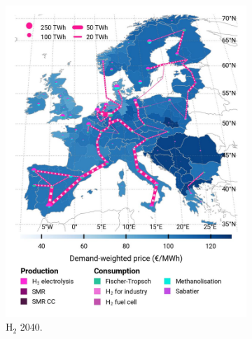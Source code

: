 \documentclass[pdflatex,sn-nature]{sn-jnl}
\theoremstyle{thmstyleone}%
\theoremstyle{thmstyletwo}%
\theoremstyle{thmstylethree}%
\begin{document}
\begin{figure}[htbp]
\begin{subfigure}[t]{0.32\textwidth}
      \includegraphics[width=1\textwidth]{figures/pci___base_s_adm___2040-balance_map_H2.jpg}
      \caption{H$_2$ 2040.}
      \label{fig:PCI_lt_2040_h2}
  \end{subfigure}
  \begin{subfigure}[t]{0.32\textwidth}
    \vspace{0pt}

\end{subfigure}
\end{figure}
\end{document}
